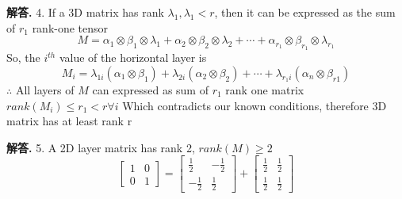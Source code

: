 \documentclass[12pt, a4paper, oneside]{article}
\newenvironment{solution}{\par\noindent\textbf{解答. }}{\par}
\begin{document}
\begin{CJK}{UTF8}{gbsn}
\begin{solution}
  4. \newline
  If a 3D matrix has rank $\lambda_1, \lambda_1 < r$, then it can be expressed as the sum of $r_1$ rank-one tensor \newline
  $$ M = \alpha_1\otimes\beta_1\otimes\lambda_1 + \alpha_2\otimes\beta_2\otimes\lambda_2 + \cdots + \alpha_{r_1}\otimes\beta_{r_1}\otimes\lambda_{r_1}$$
  So, the $i^{th}$ value of the horizontal layer is 
  $$ M_i = \lambda_{1i}(\alpha_1\otimes\beta_1) + \lambda_{2i}(\alpha_2\otimes\beta_2)+\cdots+\lambda_{r_1i}(\alpha_n\otimes\beta_{r1})$$ 
  $\therefore$ \newline
  All layers of $M$ can expressed as sum of $r_1$ rank one matrix \newline 
  $rank(M_i) \leq r_1 < r \forall i $ \newline
  Which contradicts our known conditions, therefore 3D matrix has at least rank r 
\end{solution}

\begin{solution}
  5. \newline
  A 2D layer matrix has rank 2, $rank(M) \geq 2$
  $$ \begin{bmatrix}
    1 & 0 \\ 0 & 1
  \end{bmatrix} = \begin{bmatrix}
      \frac{1}{2} & -\frac{1}{2} \\
      -\frac{1}{2} & \frac{1}{2}
  \end{bmatrix} + \begin{bmatrix}
    \frac{1}{2} & \frac{1}{2} \\
    \frac{1}{2} & \frac{1}{2}
  \end{bmatrix}$$


\end{solution}
\end{CJK}
\end{document}
